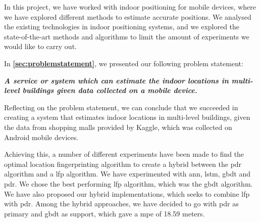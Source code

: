 In this project, we have worked with indoor positioning for mobile devices, where we have explored different methods to estimate accurate positions. We analysed the existing technologies in indoor positioning systems, and we explored the state-of-the-art methods and algorithms to limit the amount of experiments we would like to carry out.

In \textbf{\autoref{sec:problemstatement}}, we presented our following problem statement: 

\begin{center}
    \textbf{\textit{A service or system which can estimate the indoor locations in multi-level buildings given data collected on a mobile device.}}
\end{center}

Reflecting on the problem statement, we can conclude that we succeeded in creating a system that estimates indoor locations in multi-level buildings, given the data from shopping malls provided by Kaggle, which was collected on Android mobile devices. 

Achieving this, a number of different experiments have been made to find the optimal location fingerprinting algorithm to create a hybrid between the \acrlong{pdr} algorithm and a \gls{lfp} algorithm. We have experimented with \acrlong{ann}, \acrlong{lstm}, \acrlong{gbdt} and \acrlong{pdr}. We chose the best performing \gls{lfp} algorithm, which was the \gls{gbdt} algorithm. We have also proposed our hybrid implementations, which seeks to combine \gls{lfp} with \gls{pdr}.
Among the hybrid approaches, we have decided to go with \gls{pdr} as primary and \gls{gbdt} as support, which gave a \acrlong{mpe} of 18.59 meters.